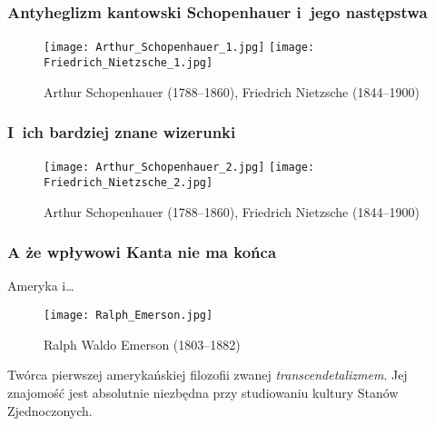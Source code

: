 \documentclass{beamer}  %
\begin{document}
\begin{frame}
  \frametitle{Antyheglizm kantowski Schopenhauer i~jego następstwa}

  \begin{block}{}
    \begin{figure}
      \centering

      \texttt{[image: Arthur\_Schopenhauer\_1.jpg]}
      \texttt{[image: Friedrich\_Nietzsche\_1.jpg]} \pause

      \caption{Arthur Schopenhauer (1788--1860), Friedrich Nietzsche
        (1844--1900)}
    \end{figure}
  \end{block}

\end{frame}



\begin{frame}
  \frametitle{I~ich bardziej znane wizerunki}

  \begin{block}{}
    \begin{figure}
      \centering

      \texttt{[image: Arthur\_Schopenhauer\_2.jpg]}
      \texttt{[image: Friedrich\_Nietzsche\_2.jpg]}

      \caption{Arthur Schopenhauer (1788--1860), Friedrich Nietzsche
        (1844--1900)}
    \end{figure}
  \end{block}

\end{frame}



\begin{frame}
  \frametitle{A że wpływowi Kanta nie ma końca}

  \begin{block}{Ameryka i\ldots}
    \begin{figure}
      \centering

      \texttt{[image: Ralph\_Emerson.jpg]}

      \caption{Ralph Waldo Emerson (1803--1882)}
    \end{figure}
  \end{block}

  \begin{block}{}
    Twórca pierwszej amerykańskiej filozofii zwanej
    \emph{transcendetalizmem}. Jej znajomość jest absolutnie niezbędna
    przy studiowaniu kultury Stanów Zjednoczonych.
  \end{block}

\end{frame}
\end{document}
